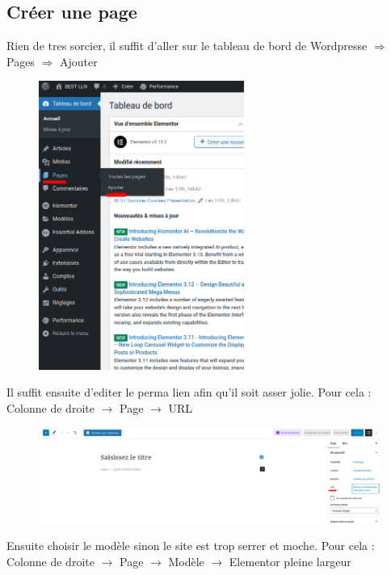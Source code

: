 \documentclass[12pt]{article}
\begin{document}
	 \subsection{Créer une page}
	 	Rien de tres sorcier, il suffit d'aller sur le tableau de bord de Wordpresse $\Rightarrow$ Pages $\Rightarrow$ Ajouter
	 	\begin{figure}[htp]
			\centering
			\includegraphics[width=0.6\textwidth]{img/CreerPage.png}
		\end{figure}
		
		Il suffit ensuite d'editer le perma lien afin qu'il soit asser jolie. Pour cela : Colonne de droite $\rightarrow$ Page $\rightarrow$ URL
		
		\begin{figure}[htp]
			\centering
			\includegraphics[width=\textwidth]{img/URL.png}
		\end{figure}
		
		Ensuite choisir le modèle sinon le site est trop serrer et moche. Pour cela : Colonne de droite $\rightarrow$ Page $\rightarrow$ Modèle $\rightarrow$  Elementor pleine largeur
		
\end{document}
